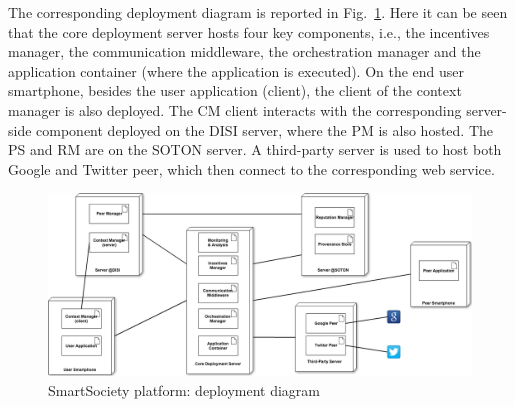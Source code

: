 The corresponding deployment diagram is reported in Fig.~\ref{fig:deployDiagram}. Here it can be seen that the core deployment server hosts four key components, i.e., the incentives manager, the communication middleware, the orchestration manager and the application container (where the application is executed). On the end user smartphone, besides the user application (client), the client of the context manager is also  deployed. The CM client interacts with the corresponding server-side component deployed on the DISI server, where the PM is also hosted. The PS and RM are on the SOTON server. A third-party server is used to host both Google and Twitter peer, which then connect to the corresponding web service. 
\begin{figure}
 \centering
 \includegraphics[width=1\textwidth]{figs/deploymentView}
 \caption{SmartSociety platform: deployment diagram}
 \label{fig:deployDiagram}
\end{figure}

